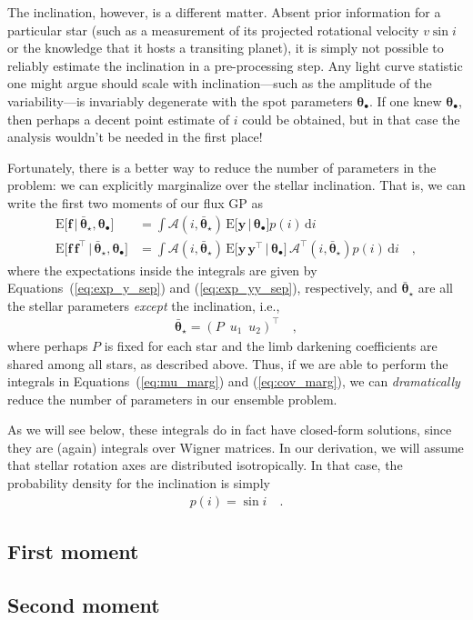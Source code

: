 \documentclass[modern]{aastex62}
\begin{document}
The inclination, however, is a different matter. Absent prior information
for a particular star (such as a measurement of its projected rotational
velocity $v\sin i$ or the knowledge that it hosts a transiting planet), it
is simply not possible to reliably estimate the inclination in a
pre-processing step. Any light curve statistic one might argue should scale
with inclination---such as the amplitude of the variability---is invariably
degenerate with the spot parameters $\pmb{\theta}_\bullet$. If one knew
$\pmb{\theta}_\bullet$, then perhaps a decent point estimate of $i$ could
be obtained, but in that case the analysis wouldn't be needed in the first place!
%

Fortunately, there is a better way to reduce the number of parameters in
the problem: we can explicitly marginalize over the stellar inclination.
That is, we can write the first two moments of our flux GP as
%
\begin{align}
    \label{eq:mu_marg}
    \mathrm{E} \Big[ \mathbf{f} \, \Big| \, \bar{\pmb{\theta}}_\star, \pmb{\theta}_\bullet \Big]
     & =
    \int
    \pmb{\mathcal{A}}(i, \bar{\pmb{\theta}}_\star) \,
    \mathrm{E} \Big[ \mathbf{y} \, \Big| \, \pmb{\theta}_\bullet \Big]
    p(i) \, \mathrm{d}i \\
    \label{eq:cov_marg}
    \mathrm{E} \Big[ \mathbf{f} \, \mathbf{f}^\top \, \Big| \, \bar{\pmb{\theta}}_\star, \pmb{\theta}_\bullet \Big]
     & =
    \int
    \pmb{\mathcal{A}}(i, \bar{\pmb{\theta}}_\star) \,
    \mathrm{E} \Big[ \mathbf{y} \, \mathbf{y}^\top \, \Big| \, \pmb{\theta}_\bullet \Big] \,
    \pmb{\mathcal{A}}^\top(i, \bar{\pmb{\theta}}_\star)
    p(i) \, \mathrm{d}i    \quad,
\end{align}
%
where the expectations inside the integrals are given by
Equations~(\ref{eq:exp_y_sep}) and (\ref{eq:exp_yy_sep}), respectively, and
$\bar{\pmb{\theta}}_\star$ are all the stellar parameters \emph{except}
the inclination, i.e.,
%
\begin{align}
    \bar{\pmb{\theta}}_\star = \left(
    P \,\,\,
    u_1 \,\,\,
    u_2
    \right)^\top
    \quad,
\end{align}
%
where perhaps $P$ is fixed for each star and the limb darkening coefficients
are shared among all stars, as described above.
%
Thus, if we are able to perform the integrals in Equations~(\ref{eq:mu_marg})
and (\ref{eq:cov_marg}), we can \emph{dramatically} reduce the number of
parameters in our ensemble problem.

As we will see below, these integrals do in fact have closed-form solutions,
since they are (again) integrals over Wigner matrices. In our derivation,
we will assume that stellar rotation axes are distributed isotropically. In
that case, the probability density for the inclination is simply
%
\begin{align}
    p(i) = \sin i
    \quad.
\end{align}

\subsection{First moment}

\subsection{Second moment}


\end{document}
